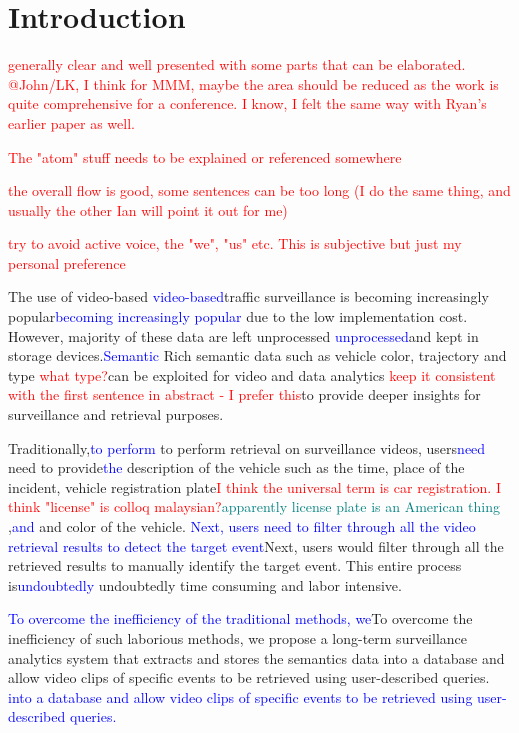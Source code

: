 \documentclass[runningheads]{llncs}
\newcommand{\ian}[1]{\textcolor{red}{#1}}
\newcommand{\lk}[1]{\textcolor{blue}{#1}}
\newcommand{\js}[1]{\textcolor{magenta}{#1}}
\newcommand{\cc}[1]{\textcolor{teal}{#1}}
\newcommand{\ian}[1]{}   %
\newcommand{\lk}[1]{}   %
\newcommand{\js}[1]{}   %
\newcommand{\cc}[1]{}   %
\begin{document}
\section{Introduction}
%

\ian{generally clear and well presented with some parts that can be elaborated.  @John/LK, I think for MMM, maybe the area should be reduced as the work is quite comprehensive for a conference. I know, I felt the same way with Ryan's earlier paper as well.}

\ian{The "atom" stuff needs to be explained or referenced somewhere}

\ian{the overall flow is good, some sentences can be too long (I do the same thing, and usually the other Ian will point it out for me)}

\ian{try to avoid active voice, the "we", "us" etc.  This is subjective but just my personal preference}

The use of video-based \lk{video-based}traffic surveillance is becoming increasingly popular\lk{becoming increasingly popular} due to the low implementation cost. However, majority of these data are left unprocessed \lk{unprocessed}and kept in storage devices.\lk{Semantic} Rich semantic data such as vehicle color, trajectory and type \ian{what type?}can be exploited for video and data analytics \ian{keep it consistent with the first sentence in abstract - I prefer this}to provide deeper insights for surveillance and retrieval purposes.%

Traditionally,\lk{to perform} to perform retrieval on surveillance videos, users\lk{need} need to provide\lk{the} description of the vehicle such as the time, place of the incident, vehicle registration plate\ian{I think the universal term is car registration. I think "license" is colloq malaysian?}\cc{apparently license plate is an American thing },\lk{and} and color of the vehicle. \lk{Next, users need to filter through all the video retrieval results to detect the target event}Next, users would filter through all the retrieved results to manually identify 
the target event. %
This entire process is\lk{undoubtedly} undoubtedly time consuming and labor intensive.

\lk{To overcome the inefficiency of the traditional methods, we}To overcome the inefficiency of such laborious methods, %
we propose a long-term surveillance analytics system that extracts and stores the semantics data into a database 
and allow video clips of specific events to be retrieved using user-described queries. \lk{into a database and allow video clips of specific events to be retrieved using user-described queries.} %
\end{document}

